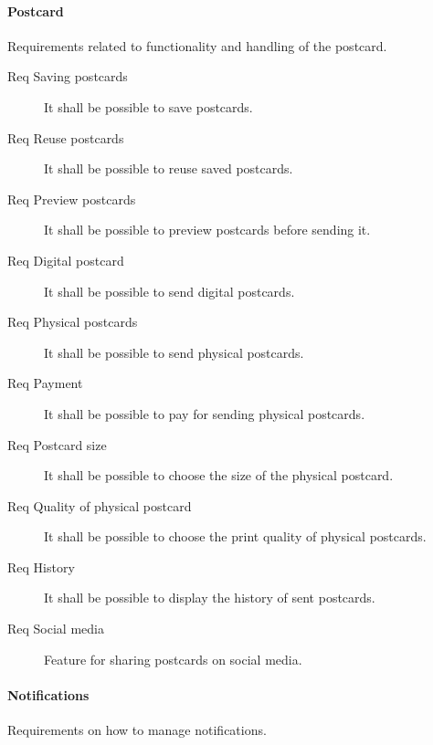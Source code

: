 \documentclass[10pt,a4paper]{article}
\begin{document}
\paragraph{Postcard}
Requirements related to functionality and handling of the postcard.

\begin{description}
	\item [Req  Saving postcards] It shall be possible to save postcards.
	\item [Req  Reuse postcards] It shall be possible to reuse saved postcards.
	
	\item [Req  Preview postcards] It shall be possible to preview postcards before sending it.
	
	\item [Req  Digital postcard] It shall be possible to send digital postcards.
	\item [Req  Physical postcards] It shall be possible to send physical postcards.
	
	\item [Req  Payment] It shall be possible to pay for sending physical postcards.
	
	\item [Req  Postcard size] It shall be possible to choose the size of the physical postcard.
	\item [Req  Quality of physical postcard] It shall be possible to choose the print quality of physical postcards. 
	\item [Req  History] It shall be possible to display the history of sent postcards.
	
	\item [Req  Social media] Feature for sharing postcards on social media.
\end{description}

\paragraph{Notifications}
Requirements on how to manage notifications.
\end{document}
